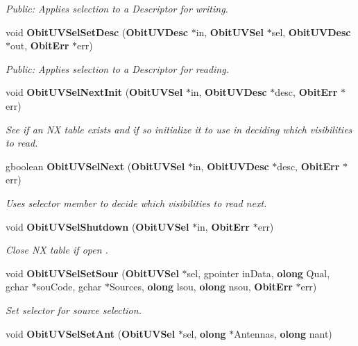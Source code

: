 \begin{CompactItemize}
\begin{CompactList}\small\item\em Public: Applies selection to a Descriptor for writing. \item\end{CompactList}\item 
void {\bf Obit\-UVSel\-Set\-Desc} ({\bf Obit\-UVDesc} $\ast$in, {\bf Obit\-UVSel} $\ast$sel, {\bf Obit\-UVDesc} $\ast$out, {\bf Obit\-Err} $\ast$err)
\begin{CompactList}\small\item\em Public: Applies selection to a Descriptor for reading. \item\end{CompactList}\item 
void {\bf Obit\-UVSel\-Next\-Init} ({\bf Obit\-UVSel} $\ast$in, {\bf Obit\-UVDesc} $\ast$desc, {\bf Obit\-Err} $\ast$err)
\begin{CompactList}\small\item\em See if an NX table exists and if so initialize it to use in deciding which visibilities to read. \item\end{CompactList}\item 
gboolean {\bf Obit\-UVSel\-Next} ({\bf Obit\-UVSel} $\ast$in, {\bf Obit\-UVDesc} $\ast$desc, {\bf Obit\-Err} $\ast$err)
\begin{CompactList}\small\item\em Uses selector member to decide which visibilities to read next. \item\end{CompactList}\item 
void {\bf Obit\-UVSel\-Shutdown} ({\bf Obit\-UVSel} $\ast$in, {\bf Obit\-Err} $\ast$err)
\begin{CompactList}\small\item\em Close NX table if open . \item\end{CompactList}\item 
void {\bf Obit\-UVSel\-Set\-Sour} ({\bf Obit\-UVSel} $\ast$sel, gpointer in\-Data, {\bf olong} Qual, gchar $\ast$sou\-Code, gchar $\ast$Sources, {\bf olong} lsou, {\bf olong} nsou, {\bf Obit\-Err} $\ast$err)
\begin{CompactList}\small\item\em Set selector for source selection. \item\end{CompactList}\item 
void {\bf Obit\-UVSel\-Set\-Ant} ({\bf Obit\-UVSel} $\ast$sel, {\bf olong} $\ast$Antennas, {\bf olong} nant)

\end{CompactItemize}
